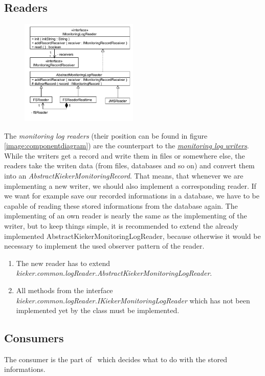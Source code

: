 \documentclass[a4paper, oneside, 11pt]{scrartcl}
\begin{document}
\subsection{Readers}
\begin{figure}[H]
	\begin{center}
		\includegraphics[width=0.5\textwidth]{kieker_readerimpls.pdf}
		\label{image:readers}
		\caption{}
	\end{center}
\end{figure}
The \textit{monitoring log readers} (their position can be found in figure \ref{image:componentdiagram}) are the counterpart to the \hyperlink{monitoringlogwriters}{\textit{monitoring log writers}}. While the writers get a record and write them in files or somewhere else, the readers take the writen data (from files, databases and so on) and convert them into an \textit{AbstractKiekerMonitoringRecord}. That means, that whenever we are implementing a new writer, we should also implement a corresponding reader. If we want for example save our recorded informations in a database, we have to be capable of reading these stored informations from the database again. The implementing of an own reader is nearly the same as the implementing of the writer, but to keep things simple, it is recommended to extend the already implemented AbstractKiekerMonitoringLogReader, because otherwise it would be necessary to implement the used observer pattern of the reader. 
\begin{enumerate}
 \item The new reader has to extend \textit{kieker.common.logReader.AbstractKiekerMonitoringLogReader}.
 \item All methods from the interface  \textit{kieker.common.logReader.IKiekerMonitoringLogReader} which has not been implemented yet by the class must be implemented.
\end{enumerate}

\subsection{Consumers}
The consumer is the part of \Kieker\ which decides what to do with the stored informations. 
\end{document}
